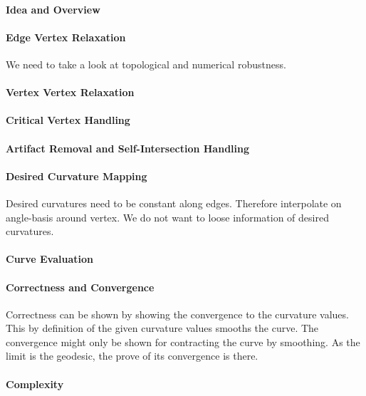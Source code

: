 \documentclass{stdlocal}
\begin{document}
  \paragraph{Idea and Overview}
  \paragraph{Edge Vertex Relaxation}
    We need to take a look at topological and numerical robustness.
  \paragraph{Vertex Vertex Relaxation}
  \paragraph{Critical Vertex Handling}
  \paragraph{Artifact Removal and Self-Intersection Handling}
  \paragraph{Desired Curvature Mapping}
    Desired curvatures need to be constant along edges.
    Therefore interpolate on angle-basis around vertex.
    We do not want to loose information of desired curvatures.
  \paragraph{Curve Evaluation}
  \paragraph{Correctness and Convergence}
    Correctness can be shown by showing the convergence to the curvature values.
    This by definition of the given curvature values smooths the curve.
    The convergence might only be shown for contracting the curve by smoothing.
    As the limit is the geodesic, the prove of its convergence is there.
  \paragraph{Complexity}

\end{document}
